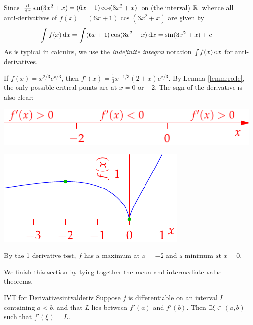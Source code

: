 \begin{examples}{}{}
	\exstart Since $\frac{\mathrm{d} }{\mathrm{d} x}\sin(3x^2+x)=(6x+1)\cos(3x^2+x)$ on (the interval) $\mathbb{R}$, whence all anti-derivatives of $f(x)=(6x+1)\cos(3x^2+x)$ are given by
	\[
		\int f(x)\,{\mathrm{d} x}=\int (6x+1)\cos(3x^2+x)\,{\mathrm{d} x}=\sin(3x^2+x)+c
	\]
	As is typical in calculus, we use the \emph{indefinite integral} notation $\int f(x)\,{\mathrm{d} x}$ for anti-derivatives.
	\begin{enumerate}\setcounter{enumi}{1}
	  \begin{minipage}[t]{0.6\linewidth}\vspace{-5pt}
	  	\item If $f(x)=x^{2/3}e^{x/3}$, then $f'(x)=\frac 13x^{-1/3}(2+x)e^{x/3}$.\smallbreak
	  	By Lemma \ref{lemm:rolle}, the only possible critical points are at $x=0$ or $-2$. The sign of the derivative is also clear:
	  	\begin{center}
	  		\includegraphics[scale=0.95]{mvt-ex3}
	  	\end{center}
	  \end{minipage}
	  \hfill
	  \begin{minipage}[t]{0.39\linewidth}\vspace{0pt}
	  	\flushright\includegraphics[scale=0.95]{mvt-ex2}
	  \end{minipage}
	  \smallbreak	
		By the 1\st{} derivative test, $f$ has a maximum at $x=-2$ and a minimum at $x=0$.
	\end{enumerate}
\end{examples}

We finish this section by tying together the mean and intermediate value theorems.

\begin{thm}{IVT for Derivatives}{intvalderiv}
	Suppose $f$ is differentiable on an interval $I$ containing $a<b$, and that $L$ lies between $f'(a)$ and $f'(b)$. Then $\exists\xi\in(a,b)$ such that $f'(\xi)=L$.
\end{thm}

